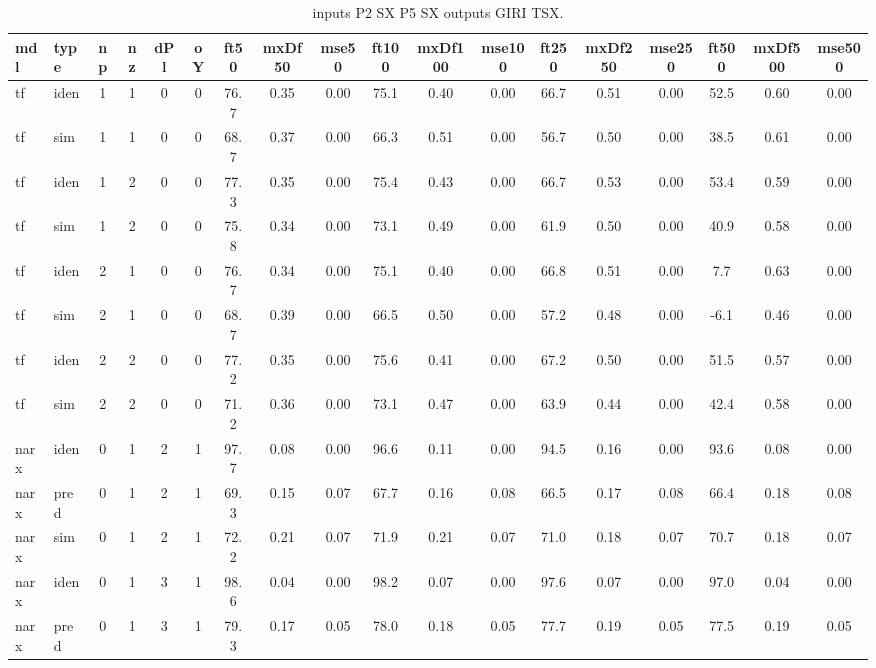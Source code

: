 \begin{landscape} 
 \begin{center} 
 \footnotesize 
 \begin{longtable}{ll|cccc|ccc|ccc|ccc|ccc} 
\caption[inputs P2 SX P5 SX   outputs GIRI TSX]{inputs P2 SX P5 SX   outputs GIRI TSX.} 
\label{tab:inputs_P2_SX_P5_SX___outputs_GIRI_TSX} 
\hline 
  mdl & type & np & nz & dPl & oY & ft50 & mxDf50 & mse50 & ft100 & mxDf100 & mse100 & ft250 & mxDf250 & mse250 & ft500 & mxDf500 & mse500 \\ 
 \hline 
tf  & iden & 1 & 1 & 0 & 0 & 76.7 & 0.35 & 0.00 & 75.1 & 0.40 & 0.00 & 66.7 & 0.51 & 0.00 & 52.5 & 0.60 & 0.00 \\ 
tf  & sim  & 1 & 1 & 0 & 0 & 68.7 & 0.37 & 0.00 & 66.3 & 0.51 & 0.00 & 56.7 & 0.50 & 0.00 & 38.5 & 0.61 & 0.00 \\ 
 \hline 
tf  & iden & 1 & 2 & 0 & 0 & 77.3 & 0.35 & 0.00 & 75.4 & 0.43 & 0.00 & 66.7 & 0.53 & 0.00 & 53.4 & 0.59 & 0.00 \\ 
tf  & sim  & 1 & 2 & 0 & 0 & 75.8 & 0.34 & 0.00 & 73.1 & 0.49 & 0.00 & 61.9 & 0.50 & 0.00 & 40.9 & 0.58 & 0.00 \\ 
 \hline 
tf  & iden & 2 & 1 & 0 & 0 & 76.7 & 0.34 & 0.00 & 75.1 & 0.40 & 0.00 & 66.8 & 0.51 & 0.00 & 7.7 & 0.63 & 0.00 \\ 
tf  & sim  & 2 & 1 & 0 & 0 & 68.7 & 0.39 & 0.00 & 66.5 & 0.50 & 0.00 & 57.2 & 0.48 & 0.00 & -6.1 & 0.46 & 0.00 \\ 
 \hline 
tf  & iden & 2 & 2 & 0 & 0 & 77.2 & 0.35 & 0.00 & 75.6 & 0.41 & 0.00 & 67.2 & 0.50 & 0.00 & 51.5 & 0.57 & 0.00 \\ 
tf  & sim  & 2 & 2 & 0 & 0 & 71.2 & 0.36 & 0.00 & 73.1 & 0.47 & 0.00 & 63.9 & 0.44 & 0.00 & 42.4 & 0.58 & 0.00 \\ 
 \hline 
narx & iden & 0 & 1 & 2 & 1 & 97.7 & 0.08 & 0.00 & 96.6 & 0.11 & 0.00 & 94.5 & 0.16 & 0.00 & 93.6 & 0.08 & 0.00 \\ 
narx & pred & 0 & 1 & 2 & 1 & 69.3 & 0.15 & 0.07 & 67.7 & 0.16 & 0.08 & 66.5 & 0.17 & 0.08 & 66.4 & 0.18 & 0.08 \\ 
narx & sim  & 0 & 1 & 2 & 1 & 72.2 & 0.21 & 0.07 & 71.9 & 0.21 & 0.07 & 71.0 & 0.18 & 0.07 & 70.7 & 0.18 & 0.07 \\ 
 \hline 
narx & iden & 0 & 1 & 3 & 1 & 98.6 & 0.04 & 0.00 & 98.2 & 0.07 & 0.00 & 97.6 & 0.07 & 0.00 & 97.0 & 0.04 & 0.00 \\ 
narx & pred & 0 & 1 & 3 & 1 & 79.3 & 0.17 & 0.05 & 78.0 & 0.18 & 0.05 & 77.7 & 0.19 & 0.05 & 77.5 & 0.19 & 0.05 \\ 

\end{longtable}
\end{center}
\end{landscape}
